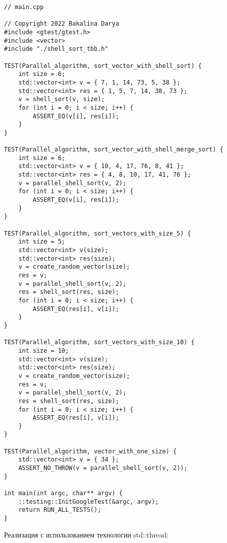 \documentclass{report}
\begin{document}
\begin{lstlisting}
// main.cpp

// Copyright 2022 Bakalina Darya
#include <gtest/gtest.h>
#include <vector>
#include "./shell_sort_tbb.h"

TEST(Parallel_algorithm, sort_vector_with_shell_sort) {
    int size = 6;
    std::vector<int> v = { 7, 1, 14, 73, 5, 38 };
    std::vector<int> res = { 1, 5, 7, 14, 38, 73 };
    v = shell_sort(v, size);
    for (int i = 0; i < size; i++) {
        ASSERT_EQ(v[i], res[i]);
    }
}

TEST(Parallel_algorithm, sort_vector_with_shell_merge_sort) {
    int size = 6;
    std::vector<int> v = { 10, 4, 17, 76, 8, 41 };
    std::vector<int> res = { 4, 8, 10, 17, 41, 76 };
    v = parallel_shell_sort(v, 2);
    for (int i = 0; i < size; i++) {
        ASSERT_EQ(v[i], res[i]);
    }
}

TEST(Parallel_algorithm, sort_vectors_with_size_5) {
    int size = 5;
    std::vector<int> v(size);
    std::vector<int> res(size);
    v = create_random_vector(size);
    res = v;
    v = parallel_shell_sort(v, 2);
    res = shell_sort(res, size);
    for (int i = 0; i < size; i++) {
        ASSERT_EQ(res[i], v[i]);
    }
}

TEST(Parallel_algorithm, sort_vectors_with_size_10) {
    int size = 10;
    std::vector<int> v(size);
    std::vector<int> res(size);
    v = create_random_vector(size);
    res = v;
    v = parallel_shell_sort(v, 2);
    res = shell_sort(res, size);
    for (int i = 0; i < size; i++) {
        ASSERT_EQ(res[i], v[i]);
    }
}

TEST(Parallel_algorithm, vector_with_one_size) {
    std::vector<int> v = { 34 };
    ASSERT_NO_THROW(v = parallel_shell_sort(v, 2));
}

int main(int argc, char** argv) {
    ::testing::InitGoogleTest(&argc, argv);
    return RUN_ALL_TESTS();
}
\end{lstlisting}

\par Реализация с использованием технологии std::thread:
\end{document}
